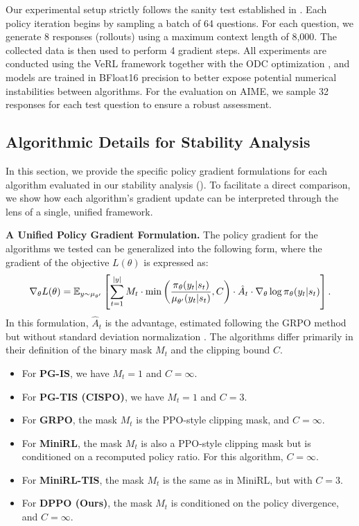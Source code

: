 Our experimental setup strictly follows the sanity test established in \citet{qi2025defeating}. Each policy iteration begins by sampling a batch of 64 questions. For each question, we generate 8 responses (rollouts) using a maximum context length of 8,000. The collected data is then used to perform 4 gradient steps. All experiments are conducted using the VeRL framework \citep{sheng2024hybridflow} together with the ODC optimization \citep{wan2026revisiting}, and models are trained in BFloat16 precision to better expose potential numerical instabilities between algorithms. For the evaluation on AIME, we sample 32 responses for each test question to ensure a robust assessment.

\subsection{Algorithmic Details for Stability Analysis}  
\label{app:sanity_test_details}  
  
In this section, we provide the specific policy gradient formulations for each algorithm evaluated in our stability analysis (). To facilitate a direct comparison, we show how each algorithm's gradient update can be interpreted through the lens of a single, unified framework.  
  
\textbf{A Unified Policy Gradient Formulation.}  
The policy gradient for the algorithms we tested can be generalized into the following form, where the gradient of the objective $L(\theta)$ is expressed as:  
\begin{equation}  
\label{eq:unified_grad}  
\nabla_\theta L(\theta) = \mathbb{E}_{y \sim \operatorname*{{\textcolor{black}{\mu}}}_{\theta'}} \left[ \sum_{t=1}^{|y|} M_t \cdot \min \left( \frac{\operatorname*{{\textcolor{black}{\pi}}}_\theta(y_t|s_t)}{\operatorname*{{\textcolor{black}{\mu}}}_{\theta'}(y_t|s_t)}, C \right) \cdot \hat{A}_t \cdot \nabla_\theta \log {\operatorname*{{\textcolor{black}{\pi}}}}_\theta(y_t|s_t) \right].  
\end{equation}  
In this formulation, $\hat{A}_t$ is the advantage, estimated following the GRPO method but without standard deviation normalization \citep{shao2024deepseekmath, liu2025understanding}. The algorithms differ primarily in their definition of the binary mask $M_t$ and the clipping bound $C$.  
  
\begin{itemize}  
    \item For \textbf{PG-IS}, we have $M_t = 1$ and $C = \infty$.  
    \item For \textbf{PG-TIS (CISPO)}, we have $M_t = 1$ and $C = 3$.  
    \item For \textbf{GRPO}, the mask $M_t$ is the PPO-style clipping mask, and $C = \infty$.  
    \item For \textbf{MiniRL}, the mask $M_t$ is also a PPO-style clipping mask but is conditioned on a recomputed policy ratio. For this algorithm, $C = \infty$.  
    \item For \textbf{MiniRL-TIS}, the mask $M_t$ is the same as in MiniRL, but with $C = 3$.  
    \item For \textbf{DPPO (Ours)}, the mask $M_t$ is conditioned on the policy divergence, and $C = \infty$.  
\end{itemize}  
  
